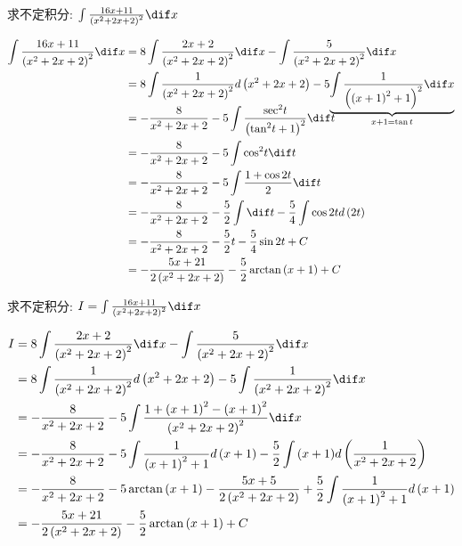 \documentclass[color=green,titlestyle=hang]{elegantbook}%
\begin{document}
\begin{exercise}
求不定积分: $\int {\frac{{16x + 11}}{{{{\left( {{x^2} + 2x + 2} \right)}^2}}}} \dif x$
\end{exercise}\begin{Solution}
\begin{align*}
\int {\frac{{16x + 11}}{{{{\left( {{x^2} + 2x + 2} \right)}^2}}}} \dif x &= 8\int {\frac{{2x + 2}}{{{{\left( {{x^2} + 2x + 2} \right)}^2}}}} \dif x - \int {\frac{5}{{{{\left( {{x^2} + 2x + 2} \right)}^2}}}} \dif x\\
&= 8\int {\frac{1}{{{{\left( {{x^2} + 2x + 2} \right)}^2}}}} d\left( {{x^2} + 2x + 2} \right) - 5\smash{\underbrace{\int {\frac{1}{{{{\left( {{{\left( {x + 1} \right)}^2} + 1} \right)}^2}}}} \dif x}\limits_{x+1=\tan t}}\\
&=  - \frac{8}{{{x^2} + 2x + 2}} - 5\int {\frac{{{{\sec }^2}t}}{{{{\left( {{{\tan }^2}t + 1} \right)}^2}}}} \dif t\\
&=  - \frac{8}{{{x^2} + 2x + 2}} - 5\int {{{\cos }^2}t} \dif t\\
& =  - \frac{8}{{{x^2} + 2x + 2}} - 5\int {\frac{{1 + \cos 2t}}{2}} \dif t\\
&=  - \frac{8}{{{x^2} + 2x + 2}} - \frac{5}{2}\int {\dif t}  - \frac{5}{4}\int {\cos 2t} d\left( {2t} \right)\\
&=  - \frac{8}{{{x^2} + 2x + 2}} - \frac{5}{2}t - \frac{5}{4}\sin 2t + C\\
& =  - \frac{{5x + 21}}{{2\left( {{x^2} + 2x + 2} \right)}} - \frac{5}{2}\arctan \left( {x + 1} \right) + C
\end{align*}	
\end{Solution}

\begin{exercise}
求不定积分: $I=
\int {\frac{{16x + 11}}{{{{\left( {{x^2} + 2x + 2} \right)}^2}}}} \dif x$
\end{exercise}\begin{Solution}
\begin{align*}
I &= 8\int {\frac{{2x + 2}}{{{{\left( {{x^2} + 2x + 2} \right)}^2}}}} \dif x - \int {\frac{5}{{{{\left( {{x^2} + 2x + 2} \right)}^2}}}} \dif x\\
&= 8\int {\frac{1}{{{{\left( {{x^2} + 2x + 2} \right)}^2}}}} d\left( {{x^2} + 2x + 2} \right) - 5\int {\frac{1}{{{{\left( {{x^2} + 2x + 2} \right)}^2}}}} \dif x\\
&=  - \frac{8}{{{x^2} + 2x + 2}} - 5\int {\frac{{1 + {{\left( {x + 1} \right)}^2} - {{\left( {x + 1} \right)}^2}}}{{{{\left( {{x^2} + 2x + 2} \right)}^2}}}} \dif x\\
&=  - \frac{8}{{{x^2} + 2x + 2}} - 5\int {\frac{1}{{{{\left( {x + 1} \right)}^2} + 1}}} d\left( {x + 1} \right) - \frac{5}{2}\int {\left( {x + 1} \right)} d\left( {\frac{1}{{{x^2} + 2x + 2}}} \right)\\
&=  - \frac{8}{{{x^2} + 2x + 2}} - 5\arctan \left( {x + 1} \right) - \frac{{5x + 5}}{{2\left( {{x^2} + 2x + 2} \right)}} + \frac{5}{2}\int {\frac{1}{{{{\left( {x + 1} \right)}^2} + 1}}} d\left( {x + 1} \right)\\
& =  - \frac{{5x + 21}}{{2\left( {{x^2} + 2x + 2} \right)}} - \frac{5}{2}\arctan \left( {x + 1} \right) + C
\end{align*}	
\end{Solution}
\end{document}
